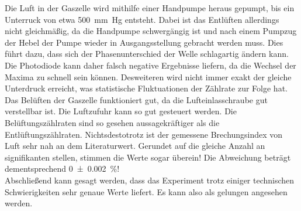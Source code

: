 \noindent Die Luft in der Gaszelle wird mithilfe einer Handpumpe heraus gepumpt, bis ein Unterruck von etwa 
\qty{500}{\milli \meter Hg} entsteht. Dabei ist das Entlüften allerdings nicht gleichmäßig, da die Handpumpe 
schwergängig ist und nach einem Pumpzug der Hebel der Pumpe wieder in Ausgangsstellung gebracht werden muss. 
Dies führt dazu, dass sich der Phasenunterschied der Welle schlagartig ändern kann. Die Photodiode kann daher 
falsch negative Ergebnisse liefern, da die Wechsel der Maxima zu schnell sein können. 
Desweiteren wird nicht immer exakt der gleiche Unterdruck erreicht, was statistische Fluktuationen der Zählrate 
zur Folge hat. Das Belüften der Gaszelle funktioniert gut, da die Lufteinlasschraube gut verstellbar ist. Die 
Luftzufuhr kann so gut gesteuert werden. Die Belüftungszählraten sind so gesehen aussagekräftiger als die 
Entlüftungszählraten.
Nichtsdestotrotz ist der gemessene Brechungsindex von Luft sehr nah an dem Literaturwert. Gerundet auf die gleiche 
Anzahl an signifikanten stellen, stimmen die Werte sogar überein! Die Abweichung beträgt dementsprechend 
\qty{0\pm0.002}{\percent}!\\

Abschließend kann gesagt werden, dass das Experiment trotz einiger technischen Schwierigkeiten sehr genaue 
Werte liefert. Es kann also als gelungen angesehen werden.







